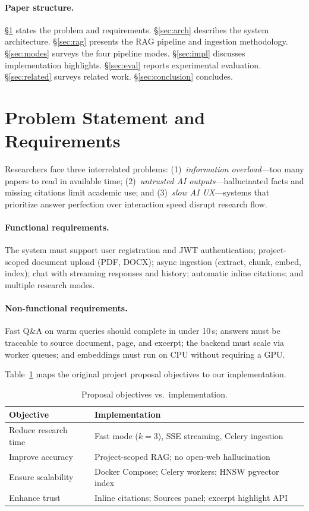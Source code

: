 \documentclass[sigplan,review,anonymous]{acmart}
\begin{document}
\paragraph{Paper structure.}
\S\ref{sec:problem} states the problem and requirements.
\S\ref{sec:arch} describes the system architecture.
\S\ref{sec:rag} presents the RAG pipeline and ingestion methodology.
\S\ref{sec:modes} surveys the four pipeline modes.
\S\ref{sec:impl} discusses implementation highlights.
\S\ref{sec:eval} reports experimental evaluation.
\S\ref{sec:related} surveys related work.
\S\ref{sec:conclusion} concludes.

\section{Problem Statement and Requirements}
\label{sec:problem}

Researchers face three interrelated problems: (1)~\emph{information overload}---too many
papers to read in available time; (2)~\emph{untrusted AI outputs}---hallucinated facts and
missing citations limit academic use; and (3)~\emph{slow AI UX}---systems that prioritize
answer perfection over interaction speed disrupt research flow.

\paragraph{Functional requirements.}
The system must support user registration and JWT authentication; project-scoped document
upload (PDF, DOCX); async ingestion (extract, chunk, embed, index); chat with streaming
responses and history; automatic inline citations; and multiple research modes.

\paragraph{Non-functional requirements.}
Fast Q\&A on warm queries should complete in under 10\,s; answers must be traceable to
source document, page, and excerpt; the backend must scale via worker queues; and embeddings
must run on CPU without requiring a GPU.

Table~\ref{tab:proposal} maps the original project proposal objectives to our implementation.

\begin{table}[t]
  \caption{Proposal objectives vs.\ implementation.}
  \label{tab:proposal}
  \small
  \begin{tabular}{@{}p{}p{}@{}}
    \toprule
    \textbf{Objective} & \textbf{Implementation} \\
    \midrule
    Reduce research time & Fast mode ($k{=}3$), SSE streaming, Celery ingestion \\
    Improve accuracy & Project-scoped RAG; no open-web hallucination \\
    Ensure scalability & Docker Compose; Celery workers; HNSW pgvector index \\
    Enhance trust & Inline citations; Sources panel; excerpt highlight API \\
    \bottomrule
  \end{tabular}
\end{table}
\end{document}
